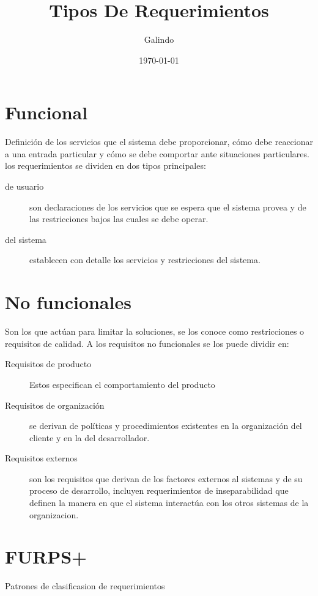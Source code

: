 \documentclass[11pt]{article}
\author{Galindo}
\date{\today}
\title{Tipos De Requerimientos}
\begin{document}
\maketitle
\tableofcontents


\section{Funcional}
\label{sec:orgb0dcb5d}
Definición de los servicios que el sistema debe proporcionar, cómo debe reaccionar a una entrada particular y cómo se debe comportar ante situaciones particulares. los requerimientos se dividen en dos tipos principales:

\begin{description}
\item[{de usuario}] son declaraciones de los servicios que se espera que el sistema provea y de las restricciones bajos las cuales se debe operar.

\item[{del sistema}] establecen con detalle los servicios y restricciones del sistema.
\end{description}

\section{No funcionales}
\label{sec:org98e7f79}
Son los que actúan para limitar la soluciones, se los conoce como restricciones o requisitos de calidad. A los requisitos no funcionales se los puede dividir en:

\begin{description}
\item[{Requisitos de producto}] Estos especifican el comportamiento del producto

\item[{Requisitos de organización}] se derivan de políticas y procedimientos existentes en la organización del cliente y en la del desarrollador.

\item[{Requisitos externos}] son los requisitos que derivan de los factores externos al sistemas y de su proceso de desarrollo, incluyen requerimientos de inseparabilidad que definen la manera en que el sistema interactúa con los otros sistemas de la organizacion.
\end{description}

\section{FURPS+}
\label{sec:org3766d74}
Patrones de clasificasion de requerimientos
\end{document}
